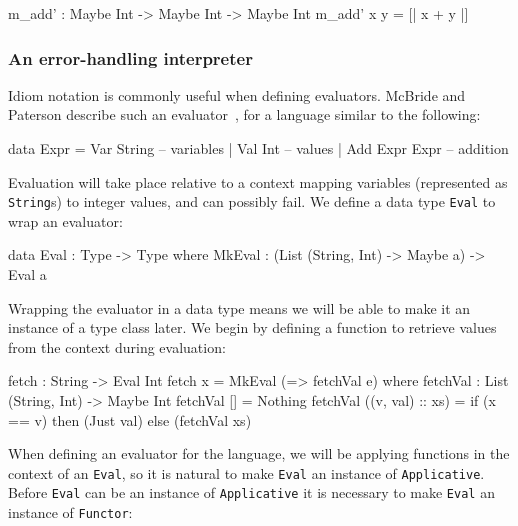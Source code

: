 \begin{code}
m_add' : Maybe Int -> Maybe Int -> Maybe Int
m_add' x y = [| x + y |]
\end{code} 

\subsubsection{An error-handling interpreter}

Idiom notation is commonly useful when defining evaluators.
McBride and Paterson describe such an evaluator~\cite{idioms}, for a language similar to the following:

\begin{code}
data Expr = Var String      -- variables
          | Val Int         -- values
          | Add Expr Expr   -- addition
\end{code} 

\noindent
Evaluation will take place relative to a context mapping variables (represented as \texttt{String}s) to integer values, and can possibly fail.
We define a data type \texttt{Eval} to wrap an evaluator:

\begin{code}
data Eval : Type -> Type where
     MkEval : (List (String, Int) -> Maybe a) -> Eval a
\end{code} 

\noindent
Wrapping the evaluator in a data type means we will be able to make it an instance of a type class later. We begin by defining a function to retrieve values from the context during evaluation:

\begin{code}
fetch : String -> Eval Int
fetch x = MkEval (\e => fetchVal e) where
    fetchVal : List (String, Int) -> Maybe Int
    fetchVal [] = Nothing
    fetchVal ((v, val) :: xs) = if (x == v) then (Just val) else (fetchVal xs)
\end{code} 
  
\noindent
When defining an evaluator for the language, we will be applying functions in the context of an \texttt{Eval}, so it is natural to make \texttt{Eval} an instance of \texttt{Applicative}.
Before \texttt{Eval} can be an instance of \texttt{Applicative} it is necessary to make \texttt{Eval} an instance of \texttt{Functor}:


